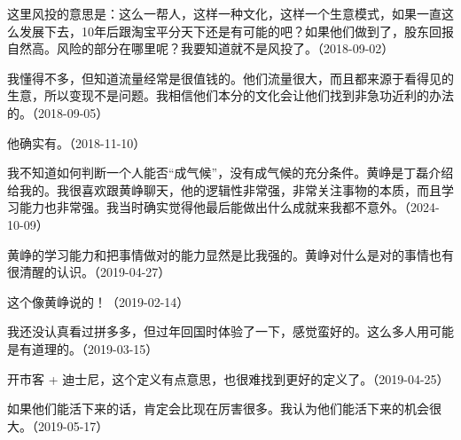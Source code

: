 这里风投的意思是：这么一帮人，这样一种文化，这样一个生意模式，如果一直这么发展下去，10年后跟淘宝平分天下还是有可能的吧？如果他们做到了，股东回报自然高。风险的部分在哪里呢？我要知道就不是风投了。（2018-09-02）


我懂得不多，但知道流量经常是很值钱的。他们流量很大，而且都来源于看得见的生意，所以变现不是问题。我相信他们本分的文化会让他们找到非急功近利的办法的。（2018-09-05）


他确实有。（2018-11-10）


我不知道如何判断一个人能否“成气候”，没有成气候的充分条件。黄峥是丁磊介绍给我的。我很喜欢跟黄峥聊天，他的逻辑性非常强，非常关注事物的本质，而且学习能力也非常强。我当时确实觉得他最后能做出什么成就来我都不意外。（2024-10-09）

黄峥的学习能力和把事情做对的能力显然是比我强的。黄峥对什么是对的事情也有很清醒的认识。（2019-04-27）





这个像黄峥说的！（2019-02-14）


我还没认真看过拼多多，但过年回国时体验了一下，感觉蛮好的。这么多人用可能是有道理的。（2019-03-15）

开市客 + 迪士尼，这个定义有点意思，也很难找到更好的定义了。（2019-04-25）


如果他们能活下来的话，肯定会比现在厉害很多。我认为他们能活下来的机会很大。（2019-05-17）


